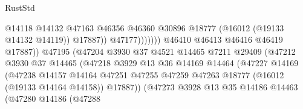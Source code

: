 \begin{lexlean}{RustStd}
\begin{coremodule}
                                                      @14118
                                                      @14132
                                                      @47163
                                                      @46356
                                                      @46360
                                                      @30896
                                                      @18777
                                                      (@16012 (@19133 @14132 @14119))
                                                      @17887))
                                                  @47177)))))))
                                    @46410
                                    @46413
                                    @46416
                                    @46419
                                    @17887))
                                @47195
                                (@47204
                                  @3930
                                  @37
                                  @4521
                                  @14465
                                  @7211
                                  @29409
                                  (@47212
                                    @3930
                                    @37
                                    @14465
                                    (@47218
                                      @3929
                                      @13
                                      @36
                                      @14169
                                      @14464
                                      (@47227
                                        @14169
                                        (@47238
                                          @14157
                                          @14164
                                          @47251
                                          @47255
                                          @47259
                                          @47263
                                          @18777
                                          (@16012 (@19133 @14164 @14158))
                                          @17887))
                                      (@47273
                                        @3928
                                        @13
                                        @35
                                        @14186
                                        @14463
                                        (@47280
                                          @14186
                                          (@47288

\end{coremodule}
\end{lexlean}
